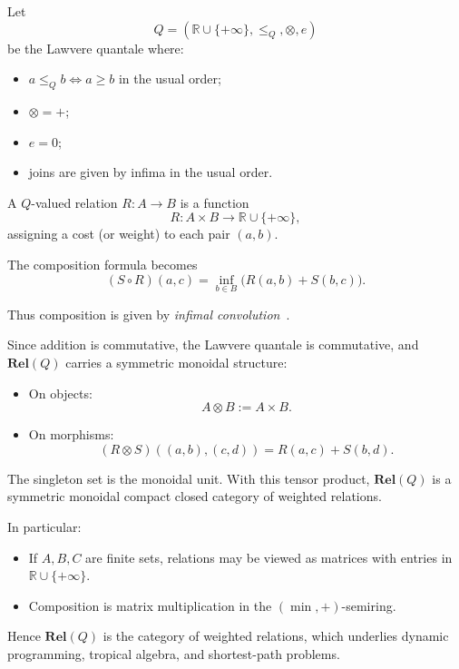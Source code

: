 \begin{example}\label{example:weighted-relations}
	Let
	\[
		Q = (\mathbb{R}\cup\{+\infty\}, \le_Q, \otimes, e)
	\]
	be the Lawvere quantale where:
	\begin{itemize}
		\item $a \le_Q b \iff a \ge b$ in the usual order;
		\item $\otimes = +$;
		\item $e = 0$;
		\item joins are given by infima in the usual order.
	\end{itemize}

	A $Q$-valued relation $R : A \to B$ is a function
	\[
		R : A \times B \to \mathbb{R} \cup \{+\infty\},
	\]
	assigning a cost (or weight) to each pair $(a,b)$.

	The composition formula becomes
	\[
		(S \circ R)(a,c)
		=
		\inf_{b \in B}
		\big(
		R(a,b) + S(b,c)
		\big).
	\]

    Thus composition is given by \emph{infimal convolution}~\cite{stein2024compositional}. 

	Since addition is commutative, the Lawvere quantale is commutative,
	and $\mathbf{Rel}(Q)$ carries a symmetric monoidal structure:

	\begin{itemize}
		\item On objects:
		      \[
			      A \otimes B := A \times B.
		      \]

		\item On morphisms:
		      \[
			      (R \otimes S)((a,b),(c,d))
			      =
			      R(a,c) + S(b,d).
		      \]
	\end{itemize}

	The singleton set is the monoidal unit.
	With this tensor product, $\mathbf{Rel}(Q)$ is a symmetric monoidal
	compact closed category of weighted relations.

	In particular:
	\begin{itemize}
		\item If $A,B,C$ are finite sets, relations may be viewed as matrices with entries in $\mathbb{R}\cup\{+\infty\}$.
		\item Composition is matrix multiplication in the $(\min,+)$-semiring.
	\end{itemize}

	Hence $\mathbf{Rel}(Q)$ is the category of weighted relations, which underlies dynamic programming, tropical algebra, and shortest-path problems.
\end{example}


